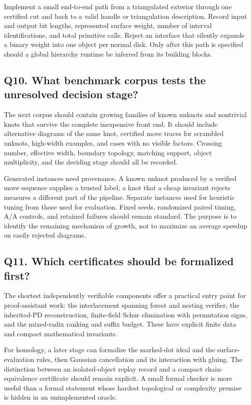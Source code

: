 Implement a small end-to-end path from a triangulated exterior through one
certified cut and back to a valid handle or triangulation description.
Record input and output bit lengths, represented surface weight, number of
interval identifications, and total primitive calls.  Reject an interface
that silently expands a binary weight into one object per normal disk.
Only after this path is specified should a global hierarchy runtime be
inferred from its building blocks.

\subsection{Q10. What benchmark corpus tests the unresolved decision stage?}

The next corpus should contain growing families of known unknots and
nontrivial knots that survive the complete inexpensive front end.  It should
include alternative diagrams of the same knot, certified move traces for
scrambled unknots, high-width examples, and cases with no visible factors.
Crossing number, effective width, boundary topology, matching support,
object multiplicity, and the deciding stage should all be recorded.

Generated instances need provenance.  A known unknot produced by a verified
move sequence supplies a trusted label; a knot that a cheap invariant
rejects measures a different part of the pipeline.  Separate instances used
for heuristic tuning from those used for evaluation.  Fixed seeds,
randomized paired timing, A/A controls, and retained failures should remain
standard.  The purpose is to identify the remaining mechanism of growth,
not to maximize an average speedup on easily rejected diagrams.

\subsection{Q11. Which certificates should be formalized first?}

The shortest independently verifiable components offer a practical entry
point for proof-assistant work: the interlacement spanning forest and nesting
verifier, the inherited-PD reconstruction, finite-field Schur elimination
with permutation signs, and the mixed-radix ranking and suffix budget.
These have explicit finite data and compact mathematical invariants.

For homology, a later stage can formalize the marked-dot ideal and the
surface-evaluation rules, then Gaussian cancellation and its interaction
with gluing.  The distinction between an isolated-object replay record and
a compact chain-equivalence certificate should remain explicit.  A small
formal checker is more useful than a formal statement whose hardest
topological or complexity premise is hidden in an unimplemented oracle.

